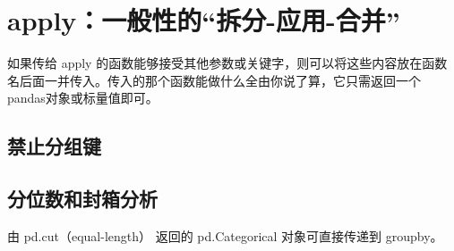 \section{apply：一般性的“拆分-应用-合并”}
如果传给 apply 的函数能够接受其他参数或关键字，则可以将这些内容放在函数名后面一并传入。传入的那个函数能做什么全由你说了算，它只需返回一个pandas对象或标量值即可。
\subsection{禁止分组键}
\subsection{分位数和封箱分析}
由 pd.cut（equal-length） 返回的 pd.Categorical 对象可直接传递到 groupby。